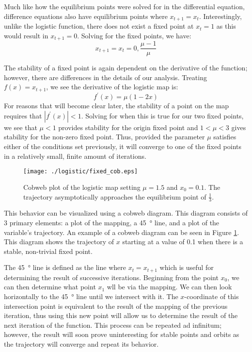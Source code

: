 Much like how the equilibrium points were solved for in the differential equation, difference equations also have equilibrium points where $x_{t+1}=x_t$. Interestingly, unlike the logistic function, there does not exist a fixed point at $x_t=1$ as this would result in $x_{t+1}=0$. Solving for the fixed points, we have:
\begin{equation}
    x_{t+1}=x_t=0,\frac{\mu-1}{\mu}
\end{equation}

The stability of a fixed point is again dependent on the derivative of the function; however, there are differences in the details of our analysis. Treating $f(x)=x_{t+1}$, we see the derivative of the logistic map is:
\begin{equation}
    f^\prime(x)=\mu(1-2x)
\end{equation}
For reasons that will become clear later, the stability of a point on the map requires that $|f^\prime(x)|<1$. Solving for when this is true for our two fixed points, we see that $\mu<1$ provides stability for the origin fixed point and $1<\mu<3$ gives stability for the non-zero fixed point. Thus, provided the parameter $\mu$ satisfies either of the conditions set previously, it will converge to one of the fixed points in a relatively small, finite amount of iterations. 

\begin{figure}
    \centering
    \texttt{[image: ./logistic/fixed\_cob.eps]}
    \caption{Cobweb plot of the logistic map setting $\mu=1.5$ and $x_0=0.1$. The trajectory asymptotically approaches the equilibrium point of $\frac{1}{3}$.}
    \label{log_fixed_cob}
\end{figure}

This behavior can be visualized using a cobweb diagram. This diagram consists of 3 primary elements: a plot of the mapping, a \SI{45}{\degree} line, and a plot of the variable's trajectory. An example of a cobweb diagram can be seen in Figure \ref{log_fixed_cob}. This diagram shows the trajectory of $x$ starting at a value of 0.1 when there is a stable, non-trivial fixed point.

The \SI{45}{\degree} line is defined as the line where $x_t=x_{t+1}$ which is useful for determining the result of successive iterations. Beginning from the point $x_0$, we can then determine what point $x_1$ wll be via the mapping. We can then look horizontally to the \SI{45}{\degree} line until we intersect with it. The $x$-coordinate of this intersection point is equivalent to the result of the mapping of the previous iteration, thus using this new point will allow us to determine the result of the next iteration of the function. This process can be repeated ad infinitum; however, the result will soon prove uninteresting for stable points and orbits as the trajectory will converge and repeat its behavior.

